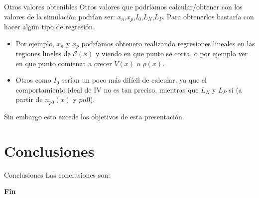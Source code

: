\documentclass[aspectratio=169,xcolor=dvipsnames]{beamer}
\newcommand{\Ecal}{\mathcal{E}}
\begin{document}
\begin{frame}{Otros valores obtenibles}
    Otros valores que podríamos calcular/obtener con los valores de la simulación podrían ser: $x_n$,$x_p$,$I_0$,$L_N$,$L_P$. Para obtenerlos bastaría con hacer algún tipo de regresión. \\
    \begin{itemize}

    \item Por ejemplo, $x_n$ y $x_p$ podríamos obtenero realizando regresiones lineales en las regiones lineles de $\Ecal(x)$ y viendo en que punto se corta, o por ejemplo ver en que punto comienza a crecer $V(x)$ o $\rho(x)$. 

    \item Otros como $I_0$ serían un poco más difícil de calcular, ya que el comportamiento ideal de IV no es tan preciso, mientras que $L_N$ y $L_P$ sí (a partir de $n_{p0}(x)$ y $p{n0}$). \\

    \end{itemize}

    Sin embargo esto excede los objetivos de esta presentación.
\end{frame}

\section{Conclusiones}

\begin{frame}{Conclusiones}
    Las conclusiones son:     
\end{frame}



%    
%    


\begin{frame}
    \Huge{\centerline{\textbf{Fin}}}
\end{frame}

\end{document}
